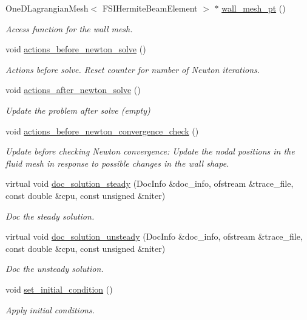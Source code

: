\begin{DoxyCompactItemize}
One\+D\+Lagrangian\+Mesh$<$ F\+S\+I\+Hermite\+Beam\+Element $>$ $\ast$ \hyperlink{classFSICollapsibleChannelProblem_ae8b71da8da82f3c52387052ce400b930}{wall\+\_\+mesh\+\_\+pt} ()
\begin{DoxyCompactList}\small\item\em Access function for the wall mesh. \end{DoxyCompactList}\item 
void \hyperlink{classFSICollapsibleChannelProblem_ad10b2d12be052c6b1bc5005dc27cd229}{actions\+\_\+before\+\_\+newton\+\_\+solve} ()
\begin{DoxyCompactList}\small\item\em Actions before solve. Reset counter for number of Newton iterations. \end{DoxyCompactList}\item 
void \hyperlink{classFSICollapsibleChannelProblem_a49780267c05f4c6ecbed11bfc6b9956b}{actions\+\_\+after\+\_\+newton\+\_\+solve} ()
\begin{DoxyCompactList}\small\item\em Update the problem after solve (empty) \end{DoxyCompactList}\item 
void \hyperlink{classFSICollapsibleChannelProblem_ace5343d2e6e6e0480d077d4f17365288}{actions\+\_\+before\+\_\+newton\+\_\+convergence\+\_\+check} ()
\begin{DoxyCompactList}\small\item\em Update before checking Newton convergence\+: Update the nodal positions in the fluid mesh in response to possible changes in the wall shape. \end{DoxyCompactList}\item 
virtual void \hyperlink{classFSICollapsibleChannelProblem_a6541733e0d9e8e09bda489d6ce567ecb}{doc\+\_\+solution\+\_\+steady} (Doc\+Info \&doc\+\_\+info, ofstream \&trace\+\_\+file, const double \&cpu, const unsigned \&niter)
\begin{DoxyCompactList}\small\item\em Doc the steady solution. \end{DoxyCompactList}\item 
virtual void \hyperlink{classFSICollapsibleChannelProblem_aa9c8f2c34cea9b43e1496cc63b1f496c}{doc\+\_\+solution\+\_\+unsteady} (Doc\+Info \&doc\+\_\+info, ofstream \&trace\+\_\+file, const double \&cpu, const unsigned \&niter)
\begin{DoxyCompactList}\small\item\em Doc the unsteady solution. \end{DoxyCompactList}\item 
void \hyperlink{classFSICollapsibleChannelProblem_afdd6752cb134fd09ee8830158ed557b2}{set\+\_\+initial\+\_\+condition} ()
\begin{DoxyCompactList}\small\item\em Apply initial conditions. \end{DoxyCompactList}\end{DoxyCompactItemize}
